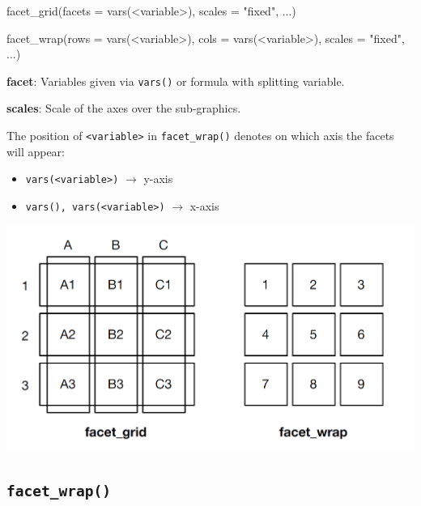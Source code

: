 \documentclass[]{book}
\newenvironment{Shaded}{}{}
\newcommand{\DataTypeTok}[1]{#1}
\newcommand{\KeywordTok}[1]{\textcolor[rgb]{0.00,0.00,1.00}{#1}}
\newcommand{\NormalTok}[1]{#1}
\newcommand{\OperatorTok}[1]{#1}
\newcommand{\StringTok}[1]{\textcolor[rgb]{0.00,0.50,0.50}{#1}}
\begin{document}
\begin{Shaded}
\begin{Highlighting}[]
\KeywordTok{facet_grid}\NormalTok{(}\DataTypeTok{facets =} \KeywordTok{vars}\NormalTok{(}\OperatorTok{<}\NormalTok{variable}\OperatorTok{>}\NormalTok{), }
           \DataTypeTok{scales =} \StringTok{"fixed"}\NormalTok{, }
\NormalTok{           ...)}

\KeywordTok{facet_wrap}\NormalTok{(}\DataTypeTok{rows =} \KeywordTok{vars}\NormalTok{(}\OperatorTok{<}\NormalTok{variable}\OperatorTok{>}\NormalTok{), }
           \DataTypeTok{cols =} \KeywordTok{vars}\NormalTok{(}\OperatorTok{<}\NormalTok{variable}\OperatorTok{>}\NormalTok{), }
           \DataTypeTok{scales =} \StringTok{"fixed"}\NormalTok{, }
\NormalTok{           ...)}
\end{Highlighting}
\end{Shaded}

\textbf{facet}: Variables given via \texttt{vars()} or formula with splitting variable.

\textbf{scales}: Scale of the axes over the sub-graphics.

The position of \texttt{\textless{}variable\textgreater{}} in \texttt{facet\_wrap()} denotes on which axis the facets will appear:

\begin{itemize}
\item
  \texttt{vars(\textless{}variable\textgreater{})} \(\rightarrow\) y-axis
\item
  \texttt{vars(),\ vars(\textless{}variable\textgreater{})} \(\rightarrow\) x-axis
\end{itemize}

\includegraphics{img/facets.png}

\hypertarget{facet_wrap}{%
\subsection{\texorpdfstring{\texttt{facet\_wrap()}}{facet\_wrap()}}\label{facet_wrap}}
\end{document}
